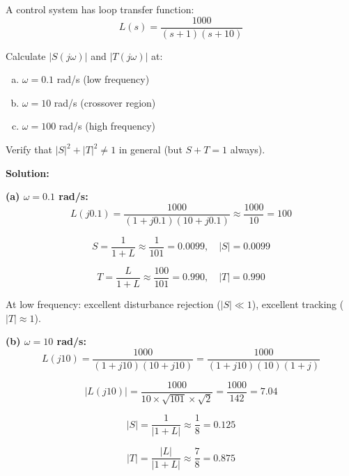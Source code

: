 \begin{example}[S + T = 1 and the Noise-Disturbance Tradeoff]
\label{ex:tradeoff}
A control system has loop transfer function:
\begin{equation}
L(s) = \frac{1000}{(s+1)(s+10)}
\end{equation}

Calculate $|S(j\omega)|$ and $|T(j\omega)|$ at:
\begin{enumerate}[(a)]
\item $\omega = 0.1$ rad/s (low frequency)
\item $\omega = 10$ rad/s (crossover region)
\item $\omega = 100$ rad/s (high frequency)
\end{enumerate}

Verify that $|S|^2 + |T|^2 \neq 1$ in general (but $S + T = 1$ always).

\textbf{Solution:}

\textbf{(a) $\omega = 0.1$ rad/s:}
\begin{equation}
L(j0.1) = \frac{1000}{(1+j0.1)(10+j0.1)} \approx \frac{1000}{10} = 100
\end{equation}

\begin{equation}
S = \frac{1}{1+L} \approx \frac{1}{101} = 0.0099, \quad |S| = 0.0099
\end{equation}

\begin{equation}
T = \frac{L}{1+L} \approx \frac{100}{101} = 0.990, \quad |T| = 0.990
\end{equation}

At low frequency: excellent disturbance rejection ($|S| \ll 1$), excellent tracking ($|T| \approx 1$).

\textbf{(b) $\omega = 10$ rad/s:}
\begin{equation}
L(j10) = \frac{1000}{(1+j10)(10+j10)} = \frac{1000}{(1+j10)(10)(1+j)}
\end{equation}

\begin{equation}
|L(j10)| = \frac{1000}{10 \times \sqrt{101} \times \sqrt{2}} = \frac{1000}{142} = 7.04
\end{equation}

\begin{equation}
|S| = \frac{1}{|1 + L|} \approx \frac{1}{8} = 0.125
\end{equation}

\begin{equation}
|T| = \frac{|L|}{|1+L|} \approx \frac{7}{8} = 0.875
\end{equation}


\end{example}
